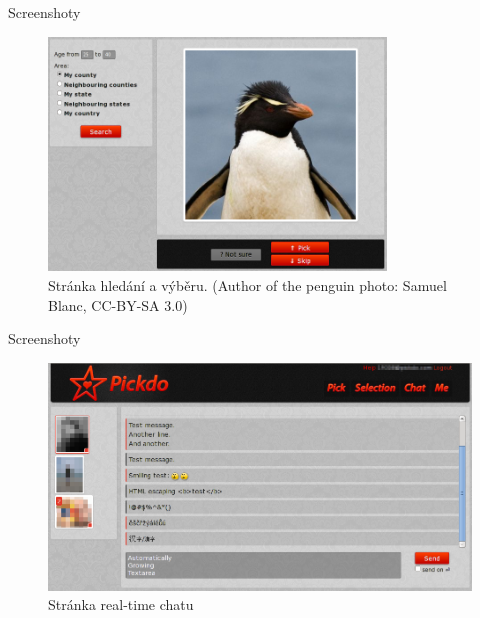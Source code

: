 \documentclass[xcolor=dvipsnames]{beamer}
\begin{document}
	\begin{frame}{Screenshoty}
		\begin{figure}[h]
	  \centering
	    \includegraphics[width=0.8\textwidth]{../tex/screen-search.png}
		  \caption{Stránka hledání a výběru. (Author of the penguin photo: Samuel Blanc, CC-BY-SA 3.0)}
		  \label{fig:screen-search}
	  \end{figure}
	\end{frame}
	\begin{frame}{Screenshoty}
			\begin{figure}[h]
	  \centering
	    \includegraphics[width=1.0\textwidth]{../tex/screen-chat.png}
		  \caption{Stránka real-time chatu}
		  \label{fig:screen-chat}
	  \end{figure}
	\end{frame}
\end{document}
